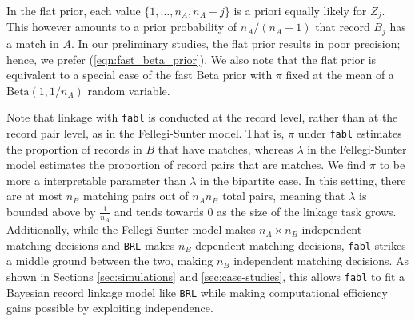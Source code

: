 \documentclass[ba]{imsart}
\begin{document}
In the \cite{wortman2019} flat prior, each value $\{1, \ldots, n_A, n_A +j\}$ is a priori equally likely for $Z_j$. This however amounts to a prior probability of $n_A / (n_A + 1)$ that record $B_j$ has a match in $A$. In our preliminary studies, the flat prior results in poor precision; hence, we prefer (\ref{eqn:fast_beta_prior}). We also note that the flat prior is equivalent to a special case of the fast Beta prior with $\pi$ fixed at the mean of a $\text{Beta}\left(1, 1 / n_A \right)$ random variable.


Note that linkage with \texttt{fabl} is conducted at the record level, rather than at the record pair level, as in the Fellegi-Sunter model. That is, $\pi$ under \texttt{fabl} estimates the proportion of records in $B$ that have matches, whereas $\lambda$ in the Fellegi-Sunter model estimates the proportion of record pairs that are matches. We find $\pi$ to be more a interpretable parameter than $\lambda$ in the bipartite case. In this setting, there are at most $n_B$ matching pairs out of $n_A n_B$ total pairs, meaning that $\lambda$ is bounded above by $\frac{1}{n_A}$ and tends towards 0 as the size of the linkage task grows. Additionally, while the Fellegi-Sunter model makes $n_A \times n_B$ independent matching decisions and \texttt{BRL} makes $n_B$ dependent matching decisions, \texttt{fabl} strikes a middle ground between the two, making $n_B$  independent matching decisions. As shown in Sections \ref{sec:simulations} and \ref{sec:case-studies}, this allows \texttt{fabl} to fit a Bayesian record linkage model like \texttt{BRL} while making computational efficiency gains possible by exploiting independence. 
\end{document}
